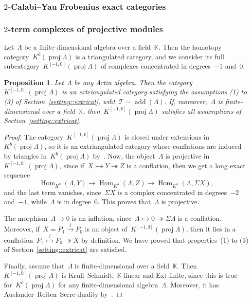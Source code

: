 \documentclass{amsart}
\newtheorem{proposition}[theorem]{Proposition}
\theoremstyle{definition}
\newcommand{\field}{\mathbb{K}}
\newcommand{\Hom}[1]{\operatorname{Hom}_{#1}}
\newcommand{\susp}{\Sigma}
\newcommand{\add}{\operatorname{add}}
\newcommand{\proj}{\operatorname{proj}}
\newcommand{\tc}{\mathcal{T}}
\newcommand{\infl}{\rightarrowtail}
\newcommand{\defl}{\twoheadrightarrow}
\begin{document}

\subsubsection{$2$-Calabi--Yau Frobenius exact categories}
\label{sect::2CYexact}


\subsubsection{$2$-term complexes of projective modules}
\label{sect::Kbproj}
Let~$\Lambda$ be a finite-dimensional algebra over a field~$\field$.  Then the homotopy category~$K^b(\proj \Lambda)$ is a triangulated category, and we consider its full subcategory~$K^{[-1,0]}(\proj \Lambda)$ of complexes concentrated in degrees~$-1$ and~$0$.

\begin{proposition}
\label{prop::2kbproj-is-extriangulated}
 Let~$\Lambda$ be any Artin algebra.  Then the category~$K^{[-1,0]}(\proj \Lambda)$ is an extriangulated category satisfying the assumptions (1) to (3) of Section~\ref{setting::extricat}, wiht~$\tc = \add(\Lambda)$.  If, moreover,~$\Lambda$ is finite-dimensional over a field~$\field$, then~$K^{[-1,0]}(\proj \Lambda)$ satisfies all assumptions of Section~\ref{setting::extricat}. 
\end{proposition}
\begin{proof}
 The category~$K^{[-1,0]}(\proj \Lambda)$ is closed under extensions in~$K^b(\proj \Lambda)$, so it is an extriangulated category whose conflations are induced by triangles in~$K^b(\proj\Lambda)$ by~\cite[Remark 2.18]{NakaokaPalu}.  Now, the object~$\Lambda$ is projective in~$K^{[-1,0]}(\proj \Lambda)$, since if~$X\infl Y\defl Z$ is a conflation, then we get a long exact sequence
 \[
  \Hom{K^b}(\Lambda,Y)\to \Hom{K^b}(\Lambda,Z) \to  \Hom{K^b}(\Lambda, \susp X),
 \]
 and the last term vanishes, since~$\susp X$ is a complex concentrated in degrees~$-2$ and~$-1$, while~$\Lambda$ is in degree~$0$.  This proves that~$\Lambda$ is projective.
 
 The morphism~$\Lambda \to 0$ is an inflation, since~$\Lambda\infl 0 \defl \susp \Lambda$ is a conflation.  Moreover, if~$X= P_1\xrightarrow{f}P_0$ is an object of~$K^{[-1,0]}(\proj\Lambda)$, then it lies in a conflation~$P_1\stackrel{f}{\infl} P_0 \defl X$ by definition.  We have proved that properties~(1) to (3) of Section~\ref{setting::extricat} are satisfied.
 
 Finally, assume that~$\Lambda$ is finite-dimensional over a field~$\field$.  Then~$K^{[-1,0]}(\proj\Lambda)$ is Krull--Schmidt,~$\field$-linear and Ext-finite, since this is true for~$K^b(\proj\Lambda)$ for any finite-dimensional algebra~$\Lambda$.  Moreover, it has Auslander--Reiten--Serre duality by~\cite[Proposition 6.1]{IyamaNakaokaPalu}.
\end{proof}
\end{document}
